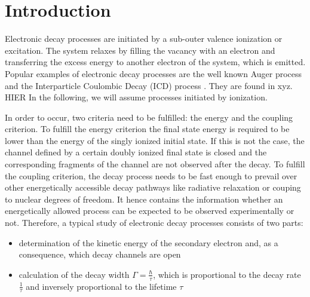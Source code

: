 \section{Introduction}
Electronic decay processes are initiated by a sub-outer valence ionization
or excitation. The system relaxes by filling the vacancy with an electron and
transferring the excess energy to another electron of the system, which is emitted.
Popular examples of electronic decay processes are the
well known Auger process \cite{Meitner22,Auger23} and the Interparticle
Coulombic Decay (ICD) process \cite{Cederbaum97,Marburger03}.
They are found in xyz. HIER
In the following, we will assume processes initiated by ionization.

In order to occur, two criteria need to be fulfilled: the energy and the coupling
criterion.
To fulfill the energy criterion the final state energy is required
to be lower than
the energy of the singly ionized initial state. If this is not the case, the
channel defined by a certain doubly ionized final state
is closed and the corresponding fragments of the
channel are not observed after the decay.
To fulfill the coupling criterion, the decay process needs to be fast enough
to prevail over other energetically accessible decay pathways like radiative
relaxation or couping to nuclear degrees of freedom.
It hence contains
the information whether an energetically allowed process can be expected
to be observed experimentally or not.
Therefore, a typical study of electronic decay processes consists of two parts:
\begin{itemize}
 \item determination of the kinetic energy of the secondary electron
       and, as a consequence, which decay channels are open
 \item calculation of the decay width $\Gamma=\frac{\hbar}{\tau}$, which
       is proportional to the decay rate $\frac{1}{\tau}$ and
       inversely proportional to the lifetime $\tau$
\end{itemize}



